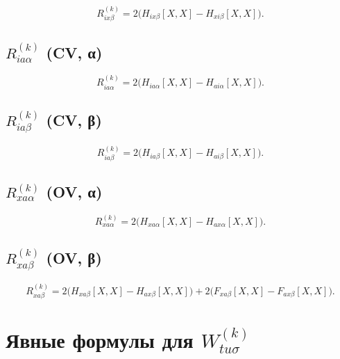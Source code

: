 \documentclass[11pt, a4paper]{article}
\theoremstyle{definition}
\begin{document}
\begin{equation}
    \boxed{R^{(k)}_{ix\beta} = 2\bigl( H_{ix\beta}[X, X] - H_{xi\beta}[X, X] \bigr).}
\end{equation}

\subsection{$R^{(k)}_{ia\alpha}$ (CV, α)}

\begin{equation}
    \boxed{R^{(k)}_{ia\alpha} = 2\bigl( H_{ia\alpha}[X, X] - H_{ai\alpha}[X, X] \bigr).}
\end{equation}

\subsection{$R^{(k)}_{ia\beta}$ (CV, β)}

\begin{equation}
    \boxed{R^{(k)}_{ia\beta} = 2\bigl( H_{ia\beta}[X, X] - H_{ai\beta}[X, X] \bigr).}
\end{equation}

\subsection{$R^{(k)}_{xa\alpha}$ (OV, α)}

\begin{equation}
    \boxed{R^{(k)}_{xa\alpha} = 2\bigl( H_{xa\alpha}[X, X] - H_{ax\alpha}[X, X] \bigr).}
\end{equation}

\subsection{$R^{(k)}_{xa\beta}$ (OV, β)}

\begin{equation}
    \boxed{R^{(k)}_{xa\beta} = 2\bigl( H_{xa\beta}[X, X] - H_{ax\beta}[X, X] \bigr) + 2\bigl( F_{xa\beta}[X, X] - F_{ax\beta}[X, X] \bigr).}
\end{equation}

\section{Явные формулы для $W^{(k)}_{tu\sigma}$}
\label{sec:Wexplicit}
\end{document}
